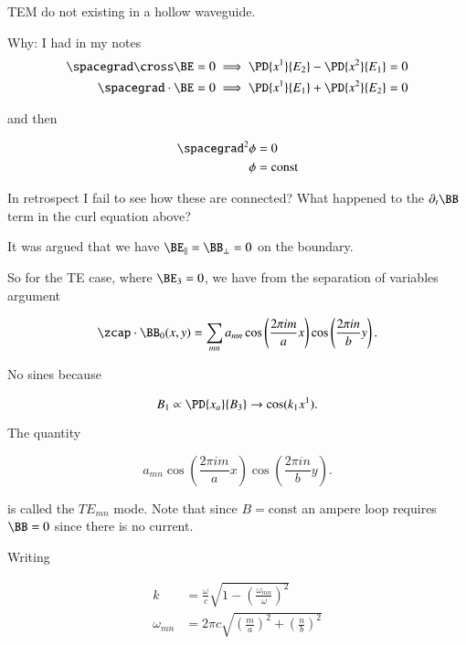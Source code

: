 \begin{claim}TEM do not existing in a hollow waveguide.
\end{claim}

Why: I had in my notes
\begin{align*}
\spacegrad \cross \BE = 0 & \implies \PD{x^1}{E_2} -\PD{x^2}{E_1} = 0 \\
\spacegrad \cdot \BE = 0 & \implies \PD{x^1}{E_1} +\PD{x^2}{E_2} = 0
\end{align*}

and then

\begin{align*}
\spacegrad^2 \phi &= 0 \\
\phi &= \text{const}
\end{align*}

In retrospect I fail to see how these are connected?  What happened to the $\partial_t \BB$ term in the curl equation above?

It was argued that we have $\BE_\parallel = \BB_\perp = 0$ on the boundary.

So for the TE case, where $\BE_3 = 0$, we have from the separation of variables argument

\begin{equation}\label{eqn:relativisticElectrodynamicsT4:440}
\zcap \cdot \BB_0(x, y) =
\sum_{m n} a_{m n} 
\cos\left( \frac{2 \pi i m}{a} x \right)
\cos\left( \frac{2 \pi i n}{b} y \right).
\end{equation}

No sines because 

\begin{equation}\label{eqn:relativisticElectrodynamicsT4:460}
B_1 \propto \PD{x_a}{B_3} \rightarrow \cos(k_1 x^1).
\end{equation}

The quantity

\begin{equation}\label{eqn:relativisticElectrodynamicsT4:480}
a_{m n}
\cos\left( \frac{2 \pi i m}{a} x \right)
\cos\left( \frac{2 \pi i n}{b} y \right).
\end{equation}

is called the $TE_{m n}$ mode.  Note that since $B = \text{const}$ an ampere loop requires $\BB = 0$ since there is no current.

Writing 

\begin{align}\label{eqn:relativisticElectrodynamicsT4:500}
k &= \frac{\omega}{c} \sqrt{ 1 - \left(\frac{\omega_{m n}}{\omega}\right)^2 } \\
\omega_{m n} &= 2 \pi c \sqrt{ \left(\frac{m}{a} \right)^2 + \left(\frac{n}{b} \right)^2 }
\end{align}

